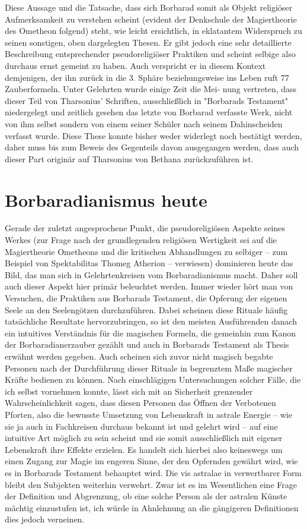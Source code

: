 \documentclass[11pt]{article}
\begin{document}
Diese Aussage und die Tatsache, dass sich Borbarad somit als Objekt religiöser Aufmerksamkeit zu verstehen scheint (evident der Denkschule der Magiertheorie des Ometheon folgend) steht, wie leicht ersichtlich, in eklatantem Widerspruch zu seinen sonstigen, oben dargelegten Thesen. Er gibt jedoch eine
sehr detaillierte Beschreibung entsprechender pseudoreligiöser Praktiken und scheint selbige also durchaus ernst gemeint zu haben. Auch verspricht er in diesem Kontext demjenigen, der ihn zurück in die 3.
Sphäre beziehungsweise ins Leben ruft 77 Zauberformeln. Unter Gelehrten wurde einige Zeit die Mei-
nung vertreten, dass dieser Teil von Tharsonius' Schriften, ausschließlich in "Borbarads Testament" niedergelegt und zeitlich gesehen das letzte von Borbarad verfasste Werk, nicht von ihm selbst sondern von
einem seiner Schüler nach seinem Dahinscheiden verfasst wurde. Diese These konnte bisher weder
widerlegt noch bestätigt werden, daher muss bis zum Beweis des Gegenteils davon ausgegangen werden, dass auch dieser Part originär auf Tharsonius von Bethana zurückzuführen ist.

\section{Borbaradianismus heute}
Gerade der zuletzt angesprochene Punkt, die pseudoreligiösen Aspekte seines Werkes (zur Frage nach
der grundlegenden religiösen Wertigkeit sei auf die Magiertheorie Ometheons und die kritischen Abhandlungen zu selbiger – zum Beispiel von Spektabilitas Thomeg Atherion – verwiesen) dominieren heute das
Bild, das man sich in Gelehrtenkreisen vom Borbaradianismus macht. Daher soll auch dieser Aspekt hier
primär beleuchtet werden. Immer wieder hört man von Versuchen, die Praktiken aus Borbarads Testament, die Opferung der eigenen Seele an den Seelengötzen durchzuführen. Dabei scheinen diese Rituale
häufig tatsächliche Resultate hervorzubringen, so ist den meisten Ausführenden danach ein intuitives
Verständnis für die magischen Formeln, die gemeinhin zum Kanon der Borbaradianerzauber gezählt und
auch in Borbarads Testament als Thesis erwähnt werden gegeben. Auch scheinen sich zuvor nicht magisch begabte Personen nach der Durchführung dieser Rituale in begrenztem Maße magischer Kräfte
bedienen zu können. Nach einschlägigen Untersuchungen solcher Fälle, die ich selbst vornehmen konnte,
lässt sich mit an Sicherheit grenzender Wahrscheinlichkeit sagen, dass diesen Personen das Öffnen der
Verbotenen Pforten, also die bewusste Umsetzung von Lebenskraft in astrale Energie – wie sie ja auch in
Fachkreisen durchaus bekannt ist und gelehrt wird – auf eine intuitive Art möglich zu sein scheint und
sie somit ausschließlich mit eigener Lebenskraft ihre Effekte erzielen. Es handelt sich hierbei also keineswegs um einen Zugang zur Magie im engeren Sinne, der den Opfernden gewährt wird, wie es in
Borbarads Testament behauptet wird. Die vis astralae in verwertbarer Form bleibt den Subjekten weiterhin verwehrt. Zwar ist es im Wesentlichen eine Frage der Definition und Abgrenzung, ob eine solche
Person als der astralen Künste mächtig einzustufen ist, ich würde in Ahnlehnung an die gängigeren Definitionen dies jedoch verneinen.
\end{document}
